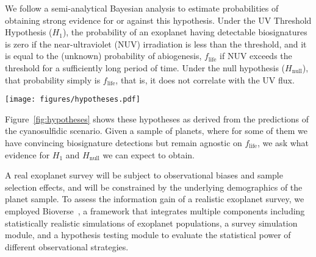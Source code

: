 \documentclass[twocolumn,twocolappendix,linenumbers]{aastex631}
\begin{document}
We follow a semi-analytical Bayesian analysis to estimate probabilities of obtaining strong evidence for or against this hypothesis.
Under the UV Threshold Hypothesis ($H_1$), the probability of an exoplanet having detectable biosignatures is zero if the near-ultraviolet (\gls{NUV}) irradiation is less than the threshold, and it is equal to the (unknown) probability of abiogenesis, $f_\mathrm{life}$ if \gls{NUV} exceeds the threshold for a sufficiently long period of time.
Under the null hypothesis ($H_\mathrm{null}$), that probability simply is $f_\mathrm{life}$, that is, it does not correlate with the UV flux.
\begin{figure*}
    \begin{centering}
        \texttt{[image: figures/hypotheses.pdf]}
        \caption{UV~Threshold Hypothesis and null hypothesis derived from the cyanosulfidic scenario.}
        \label{fig:hypotheses}
    \end{centering}
\end{figure*}
Figure~\ref{fig:hypotheses} shows these hypotheses as derived from the predictions of the cyanosulfidic scenario.
Given a sample of planets, where for some of them we have convincing biosignature detections but remain agnostic on $f_\mathrm{life}$, we ask what evidence for $H_1$ and $H_\mathrm{null}$ we can expect to obtain.

A real exoplanet survey will be subject to observational biases and sample selection effects, and will be constrained by the underlying demographics of the planet sample.
To assess the information gain of a realistic exoplanet survey, we employed Bioverse~\citep{Bixel2021,Hardegree-Ullman2023,Schlecker2024,Hardegree-Ullman2024}, a framework that integrates multiple components including statistically realistic simulations of exoplanet populations, a survey simulation module, and a hypothesis testing module to evaluate the statistical power of different observational strategies.

\end{document}
